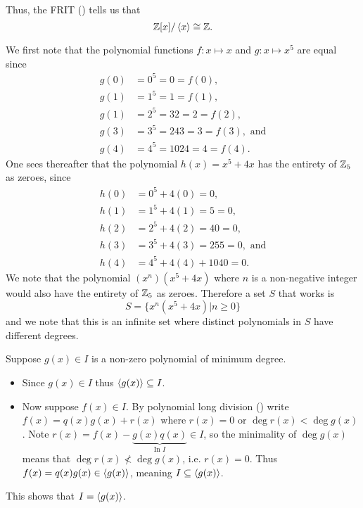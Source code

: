 \begin{questions}
    Thus, the FRIT () tells us that
    \[
        \mathbb{Z}[x] / \left\langle x\right\rangle \cong \mathbb{Z}.
    \]

    \item We first note that the polynomial functions $f: x \mapsto x$ and $g: x \mapsto x^5$ are equal since
    \begin{align*}
        g(0) &= 0^5 = 0 = f(0),\\
        g(1) &= 1^5 = 1 = f(1),\\
        g(1) &= 2^5 = 32 = 2 = f(2),\\
        g(3) &= 3^5 = 243 = 3 = f(3), \text{ and}\\
        g(4) &= 4^5 = 1024 = 4 = f(4).
    \end{align*}
    One sees thereafter that the polynomial $h(x) = x^5 + 4x$ has the entirety of $\mathbb{Z}_5$ as zeroes, since
    \begin{align*}
        h(0) &= 0^5 + 4(0) = 0,\\
        h(1) &= 1^5 + 4(1) = 5 = 0,\\
        h(2) &= 2^5 + 4(2) = 40 = 0,\\
        h(3) &= 3^5 + 4(3) = 255 = 0, \text{ and}\\
        h(4) &= 4^5 + 4(4) + 1040 = 0.
    \end{align*}
    We note that the polynomial $(x^n)(x^5 + 4x)$ where $n$ is a non-negative integer would also have the entirety of $\mathbb{Z}_5$ as zeroes. Therefore a set $S$ that works is
    \[
        S = \{x^n(x^5+4x) \vert n \geq 0\}
    \]
    and we note that this is an infinite set where distinct polynomials in $S$ have different degrees.

    \item \begin{partquestions}{\roman*}
        \item Suppose $g(x) \in I$ is a non-zero polynomial of minimum degree.
        \begin{itemize}
            \item Since $g(x) \in I$ thus $\left\langle g(x)\right\rangle \subseteq I$.
            \item Now suppose $f(x) \in I$. By polynomial long division () write $f(x) = q(x)g(x) + r(x)$ where $r(x) = 0$ or $\deg r(x) < \deg g(x)$. Note $r(x) = f(x) - \underbrace{g(x)q(x)}_{\text{In }I} \in I$, so the minimality of $\deg g(x)$ means that $\deg r(x) \not< \deg g(x)$, i.e. $r(x) = 0$. Thus $f(x) = q(x)g(x) \in \left\langle g(x)\right\rangle$, meaning $I \subseteq \left\langle g(x)\right\rangle$.
        \end{itemize}
        This shows that $I = \left\langle g(x)\right\rangle$.


\end{partquestions}
\end{questions}
